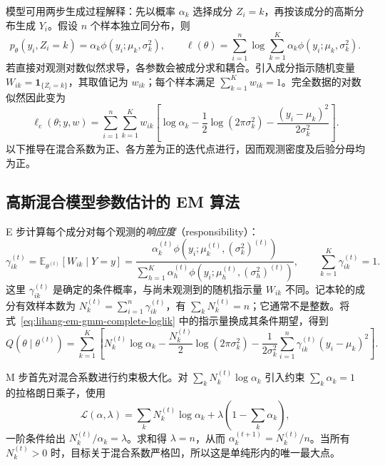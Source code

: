 模型可用两步生成过程解释：先以概率 $\alpha_k$ 选择成分 $Z_i=k$，再按该成分的高斯分布生成 $Y_i$。假设 $n$ 个样本独立同分布，则
\[
  p_\theta(y_i,Z_i=k)=\alpha_k\phi(y_i;\mu_k,\sigma_k^2),\qquad
  \ell(\theta)=\sum_{i=1}^n\log\sum_{k=1}^K
  \alpha_k\phi(y_i;\mu_k,\sigma_k^2).
\]
若直接对观测对数似然求导，各参数会被成分求和耦合。引入成分指示随机变量 $W_{ik}=\mathbf1_{\{Z_i=k\}}$，其取值记为 $w_{ik}$；每个样本满足 $\sum_{k=1}^K w_{ik}=1$。完全数据的对数似然因此变为
\begin{equation}
  \ell_{\mathrm c}(\theta;y,w)
  =\sum_{i=1}^n\sum_{k=1}^K w_{ik}
  \left[\log\alpha_k-\frac12\log(2\pi\sigma_k^2)
  -\frac{(y_i-\mu_k)^2}{2\sigma_k^2}\right].
  \label{eq:lihang-em-gmm-complete-loglik}
\end{equation}
以下推导在混合系数为正、各方差为正的迭代点进行，因而观测密度及后验分母均为正。

\subsection{高斯混合模型参数估计的 EM 算法}
\label{subsec:lihang-em-gmm-updates}

E 步计算每个成分对每个观测的\emph{响应度}（responsibility）：
\begin{equation}
  \gamma_{ik}^{(t)}
  =\mathbb E_{\theta^{(t)}}[W_{ik}\mid Y=y]
  =\frac{\alpha_k^{(t)}\phi(y_i;\mu_k^{(t)},(\sigma_k^2)^{(t)})}
  {\sum_{h=1}^K\alpha_h^{(t)}\phi(y_i;\mu_h^{(t)},(\sigma_h^2)^{(t)})},\qquad
  \sum_{k=1}^K\gamma_{ik}^{(t)}=1.
  \label{eq:lihang-em-gmm-responsibility}
\end{equation}
这里 $\gamma_{ik}^{(t)}$ 是确定的条件概率，与尚未观测到的随机指示量 $W_{ik}$ 不同。记本轮的成分有效样本数为 $N_k^{(t)}=\sum_{i=1}^n\gamma_{ik}^{(t)}$，有 $\sum_kN_k^{(t)}=n$；它通常不是整数。将式~\eqref{eq:lihang-em-gmm-complete-loglik} 中的指示量换成其条件期望，得到
\begin{equation}
  Q(\theta\mid\theta^{(t)})
  =\sum_{k=1}^K\left[
  N_k^{(t)}\log\alpha_k-\frac{N_k^{(t)}}2\log(2\pi\sigma_k^2)
  -\frac1{2\sigma_k^2}\sum_{i=1}^n\gamma_{ik}^{(t)}(y_i-\mu_k)^2\right].
  \label{eq:lihang-em-gmm-q}
\end{equation}

M 步首先对混合系数进行约束极大化。对 $\sum_kN_k^{(t)}\log\alpha_k$ 引入约束 $\sum_k\alpha_k=1$ 的拉格朗日乘子，使用
\[
  \mathcal L(\alpha,\lambda)
  =\sum_kN_k^{(t)}\log\alpha_k+\lambda\left(1-\sum_k\alpha_k\right),
\]
一阶条件给出 $N_k^{(t)}/\alpha_k=\lambda$。求和得 $\lambda=n$，从而 $\alpha_k^{(t+1)}=N_k^{(t)}/n$。当所有 $N_k^{(t)}>0$ 时，目标关于混合系数严格凹，所以这是单纯形内的唯一最大点。

